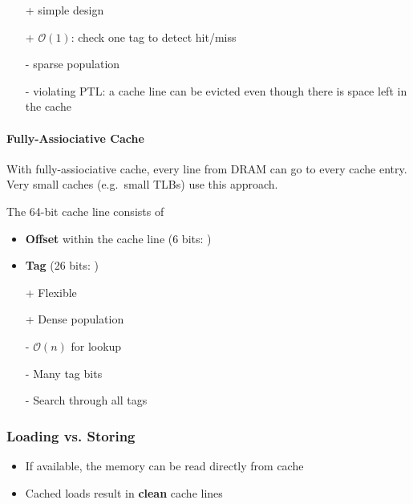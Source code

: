 \newpar{}
\begin{itemize}
    \item[+] simple design
    \item[+] $\mathcal{O}(1)$: check one tag to detect hit/miss
    \item[-] sparse population
    \item[-] violating PTL: a cache line can be evicted even though there is space left in the cache
\end{itemize}

\paragraph{Fully-Assiociative Cache}
With fully-assiociative cache, every line from DRAM can go to every cache entry. Very small caches (e.g.\ small TLBs) use this approach.

\newpar{}
The 64-bit cache line consists of
\begin{itemize}
    \item \textbf{Offset} within the cache line (6 bits: )
    \item \textbf{Tag} (26 bits: )
\end{itemize}

\newpar{}
\begin{itemize}
    \item[+] Flexible
    \item[+] Dense population
    \item[-] $\mathcal{O}(n)$ for lookup
    \item[-] Many tag bits
    \item[-] Search through all tags
\end{itemize}

\subsubsection{Loading vs. Storing}
\begin{itemize}
    \item If available, the memory can be read directly from cache
    \item Cached loads result in \textbf{clean} cache lines
\end{itemize}

